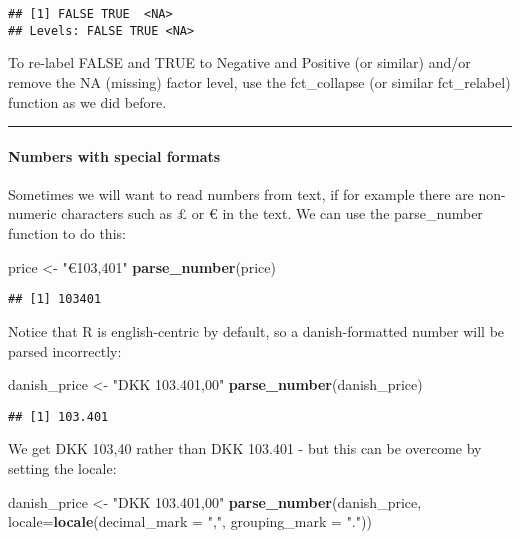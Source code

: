 \documentclass[
]{article}
\newenvironment{Shaded}{\begin{snugshade}}{\end{snugshade}}
\newcommand{\DataTypeTok}[1]{\textcolor[rgb]{0.13,0.29,0.53}{#1}}
\newcommand{\KeywordTok}[1]{\textcolor[rgb]{0.13,0.29,0.53}{\textbf{#1}}}
\newcommand{\NormalTok}[1]{#1}
\newcommand{\StringTok}[1]{\textcolor[rgb]{0.31,0.60,0.02}{#1}}
\begin{document}
\begin{verbatim}
## [1] FALSE TRUE  <NA> 
## Levels: FALSE TRUE <NA>
\end{verbatim}

To re-label FALSE and TRUE to Negative and Positive (or similar) and/or
remove the NA (missing) factor level, use the fct\_collapse (or similar
fct\_relabel) function as we did before.

\begin{center}\rule{0.5\linewidth}{0.5pt}\end{center}

\hypertarget{numbers-with-special-formats}{%
\paragraph{Numbers with special
formats}\label{numbers-with-special-formats}}

Sometimes we will want to read numbers from text, if for example there
are non-numeric characters such as £ or € in the text. We can use the
parse\_number function to do this:

\begin{Shaded}
\begin{Highlighting}[]
\NormalTok{price <-}\StringTok{ "€103,401"}
\KeywordTok{parse_number}\NormalTok{(price)}
\end{Highlighting}
\end{Shaded}

\begin{verbatim}
## [1] 103401
\end{verbatim}

Notice that R is english-centric by default, so a danish-formatted
number will be parsed incorrectly:

\begin{Shaded}
\begin{Highlighting}[]
\NormalTok{danish_price <-}\StringTok{ "DKK 103.401,00"}
\KeywordTok{parse_number}\NormalTok{(danish_price)}
\end{Highlighting}
\end{Shaded}

\begin{verbatim}
## [1] 103.401
\end{verbatim}

We get DKK 103,40 rather than DKK 103.401 - but this can be overcome by
setting the locale:

\begin{Shaded}
\begin{Highlighting}[]
\NormalTok{danish_price <-}\StringTok{ "DKK 103.401,00"}
\KeywordTok{parse_number}\NormalTok{(danish_price, }\DataTypeTok{locale=}\KeywordTok{locale}\NormalTok{(}\DataTypeTok{decimal_mark =} \StringTok{","}\NormalTok{, }\DataTypeTok{grouping_mark =} \StringTok{"."}\NormalTok{))}
\end{Highlighting}
\end{Shaded}
\end{document}
